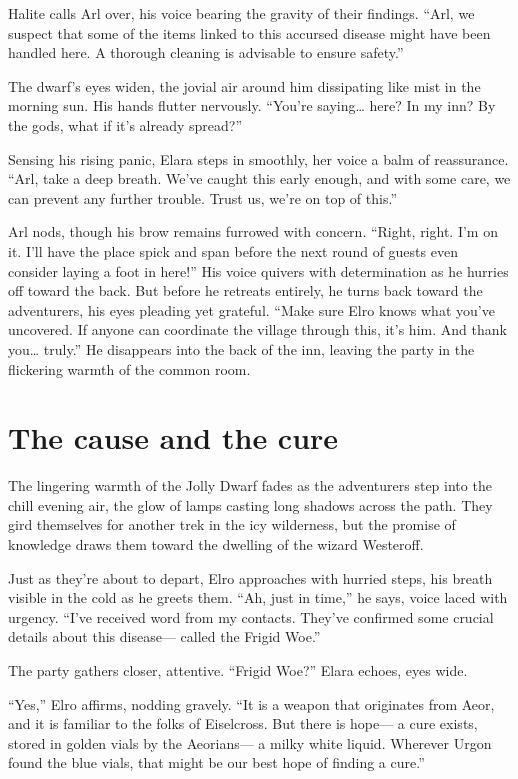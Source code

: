 \documentclass[
  letterpaper,12pt,twoside,twocolumn,openany,
  nodeprecatedcode,bg=full]{dndbook}
\begin{document}
Halite calls Arl over, his voice bearing the gravity of their findings.
``Arl, we suspect that some of the items linked to this accursed disease
might have been handled here. A thorough cleaning is advisable to ensure
safety.''

The dwarf's eyes widen, the jovial air around him dissipating like mist
in the morning sun. His hands flutter nervously. ``You're saying\ldots{}
here? In my inn? By the gods, what if it's already spread?''

Sensing his rising panic, Elara steps in smoothly, her voice a balm of
reassurance. ``Arl, take a deep breath. We've caught this early enough,
and with some care, we can prevent any further trouble. Trust us, we're
on top of this.''

Arl nods, though his brow remains furrowed with concern. ``Right, right.
I'm on it. I'll have the place spick and span before the next round of
guests even consider laying a foot in here!'' His voice quivers with
determination as he hurries off toward the back. But before he retreats
entirely, he turns back toward the adventurers, his eyes pleading yet
grateful. ``Make sure Elro knows what you've uncovered. If anyone can
coordinate the village through this, it's him. And thank you\ldots{}
truly.'' He disappears into the back of the inn, leaving the party in
the flickering warmth of the common room.

\section{The cause and the cure}\label{the-cause-and-the-cure}

The lingering warmth of the Jolly Dwarf fades as the adventurers step
into the chill evening air, the glow of lamps casting long shadows
across the path. They gird themselves for another trek in the icy
wilderness, but the promise of knowledge draws them toward the dwelling
of the wizard Westeroff.

Just as they're about to depart, Elro approaches with hurried steps, his
breath visible in the cold as he greets them. ``Ah, just in time,'' he
says, voice laced with urgency. ``I've received word from my contacts.
They've confirmed some crucial details about this disease--- called the
Frigid Woe.''

The party gathers closer, attentive. ``Frigid Woe?'' Elara echoes, eyes
wide.

``Yes,'' Elro affirms, nodding gravely. ``It is a weapon that originates
from Aeor, and it is familiar to the folks of Eiselcross. But there is
hope--- a cure exists, stored in golden vials by the Aeorians--- a milky
white liquid. Wherever Urgon found the blue vials, that might be our
best hope of finding a cure.''
\end{document}
